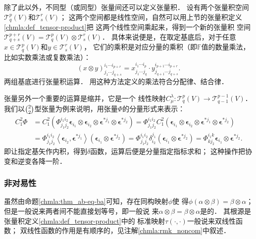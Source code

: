 
除了此以外，不同型（或同型）张量间还可以定义{\heiti 张量积}．
设有两个张量积空间$\mathcal{T}^p_q(V)$和$\mathcal{T}^r_s(V)$；
这两个空间都是线性空间，自然可以用上节的张量积定义\ref{chmla:def_tensor-product}把
这两个线性空间{\kaishu 乘}起来，得到一个新的张量积
空间$\mathcal{T}^{p+r}_{q+s}(V)=\mathcal{T}^p_q(V)\otimes \mathcal{T}^r_s(V)$．
具体来说便是，在取定基底后，对于任意$x\in \mathcal{T}^p_q(V)$和$y\in \mathcal{T}^r_s(V)$，
它们的乘积是对应分量的乘积（即$\mathbb{F}$值的数量乘法，比如实数乘法或复数乘法）：
\begin{equation}
    (x\otimes y)^{i_1\cdots i_{p+r}}_{j_1\cdots j_{q+s}}=
    x^{i_1\cdots i_{p}}_{j_1\cdots j_{q}} \cdot
    y^{i_{p +1}\cdots i_{p+r}}_{j_{q+1}\cdots j_{q+s}} .
\end{equation}
两组基底进行张量积运算．
用这种方法定义的乘法符合分配律、结合律．

张量另外一个重要的运算是{\heiti 缩并}，它是一个
线性映射$C^\lambda _\mu : \mathcal{T}^p_q(V) \to \mathcal{T}^{p-1}_{q-1}(V)$．
我们以$\binom{2}{2}$型张量为例来说明，用张量$\Phi$的分量形式来表示：
\begin{align*}
    C^2_1 \Phi & = C^2_1 \left(\Phi^{i_1 i_2} _{j_1 j_2}
    \boldsymbol{\epsilon}_{i_1} \otimes\boldsymbol{\epsilon}_{i_2} \otimes
    \boldsymbol{\epsilon}^{*j_1} \otimes \boldsymbol{\epsilon}^{*j_2}\right)
    = \Phi^{i_1 i_2} _{j_1 j_2} C^2_1 \left(
    \boldsymbol{\epsilon}_{i_1} \otimes\boldsymbol{\epsilon}_{i_2} \otimes
    \boldsymbol{\epsilon}^{*j_1} \otimes \boldsymbol{\epsilon}^{*j_2}\right)  \\
    &= \Phi^{i_1 i_2} _{j_1 j_2} \left<\boldsymbol{\epsilon}_{i_2},\boldsymbol{\epsilon}^{*j_1}\right>
    \left( \boldsymbol{\epsilon}_{i_1}  \otimes \boldsymbol{\epsilon}^{*j_2}\right)
    = \Phi^{i_1 i_2} _{j_1 j_2} \delta^{j_1}_{i_2}
    \left( \boldsymbol{\epsilon}_{i_1}  \otimes \boldsymbol{\epsilon}^{*j_2}\right)
    = \Phi^{i_1 k} _{k j_2}
       \boldsymbol{\epsilon}_{i_1}  \otimes \boldsymbol{\epsilon}^{*j_2} .
\end{align*}
即让指定基矢作内积，得到$\delta$函数，运算后便是分量指定指标求和；
这种操作把协变和逆变各降一阶．

\subsubsection*{非对易性}\label{chmla:sec_noncom}
虽然由命题\ref{chmla:thm_ab-eq-ba}可知，存在同构映射$\phi$使
得$\phi(\alpha \otimes \beta )=\beta \otimes \alpha$；
但是一般说来两者间不能直接划等号，即一般说
来$\alpha \otimes \beta =\beta \otimes \alpha$是的．
其根源是张量积定义\ref{chmla:def_tensor-product}中的
标准映射$\tau(\cdot, \cdot)$一般说来双线性函数；
双线性函数的作用是有顺序的，见注解\ref{chmla:rmk_noncom}中叙述．

